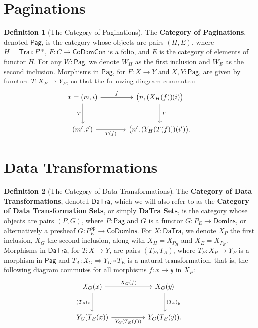 \documentclass[11pt]{article}
\theoremstyle{definition}
\newtheorem{definition}{Definition}[section]
\theoremstyle{plain}
\begin{document}
\section{Paginations}

\begin{definition}[The Category of Paginations]
The \textbf{Category of Paginations}, denoted $\mathsf{Pag}$, is the category
whose objects are pairs $(H,E)$, where
$H = \mathsf{Tra} \circ F^{\mathrm{op}}$,
$F : C \to \mathsf{CoDomCon}$ is a folio,
and $E$ is the category of elements of functor $H$. For any
$W : \mathsf{Pag}$, we denote $W_H$ as the first inclusion and $W_E$ as the
second inclusion. Morphisms in $\mathsf{Pag}$, for $F : X \to Y$ and
$X,Y : \mathsf{Pag}$, are given by functors $T : X_E \to Y_E$, so that the
following diagram commutes:
\[
\begin{tikzcd}[column sep=large,row sep=large]
x=(m,i) \arrow[r,"f"] \arrow[d,"T"']
  & \bigl(n,(X_H(f))(i)\bigr) \arrow[d,"T"] \\
(m',i') \arrow[r,"T(f)"']
  & \bigl(n',(Y_H(T(f)))(i')\bigr).
\end{tikzcd}
\]
\end{definition}

\section{Data Transformations}

\begin{definition}[The Category of Data Transformations]
The \textbf{Category of Data Transformations}, denoted $\mathsf{DaTra}$,
which we will also refer to as the \textbf{Category of Data Transformation
Sets}, or simply \textbf{DaTra Sets}, is the category whose objects are pairs
$(P,G)$, where $P : \mathsf{Pag}$ and $G$ is a functor
$G : P_E \to \mathsf{DomIns}$, or alternatively a presheaf
$G : P_E^{\mathrm{op}} \to \mathsf{CoDomIns}$. For
$X : \mathsf{DaTra}$, we denote
$X_P$ the first inclusion, $X_G$ the second inclusion, along with
$X_H = X_{P_H}$ and $X_E = X_{P_E}$. Morphisms in $\mathsf{DaTra}$, for
$T : X \to Y$, are pairs $(T_P,T_A)$, where $T_P : X_P \to Y_P$ is a
morphism in $\mathsf{Pag}$ and
$T_A : X_G \Rightarrow Y_G \circ T_E$ is a natural transformation, that is,
the following diagram commutes for all morphisms $f : x \to y$ in $X_P$:
\[
\begin{tikzcd}[column sep=huge,row sep=large]
X_G(x) \arrow[r,"X_G(f)"] \arrow[d,"(T_A)_x"']
  & X_G(y) \arrow[d,"(T_A)_y"] \\
Y_G(T_E(x)) \arrow[r,"Y_G(T_E(f))"']
  & Y_G(T_E(y)).
\end{tikzcd}
\]
\end{definition}
\end{document}
